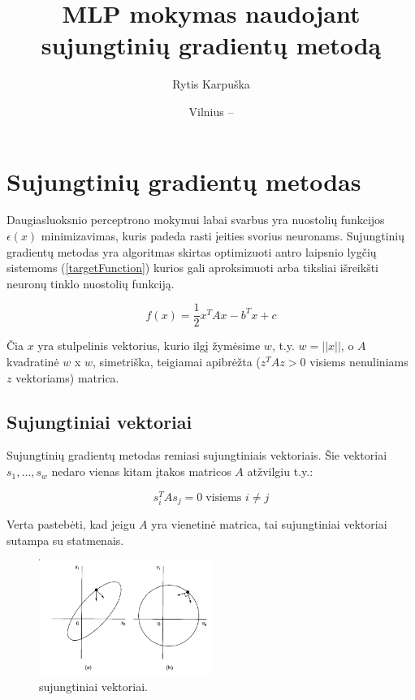 \documentclass{VUMIFPSmagistrinis}
\title{MLP mokymas naudojant sujungtinių gradientų metodą}
\author{Rytis Karpuška}
\date{Vilnius – \the\year}
\begin{document}
\maketitle

\tableofcontents

\section{Sujungtinių gradientų metodas}

Daugiasluoksnio perceptrono mokymui labai svarbus yra nuostolių funkcijos $\epsilon(x)$ minimizavimas, kuris padeda rasti įeities svorius neuronams.
Sujungtinių gradientų metodas yra algoritmas skirtas optimizuoti antro laipsnio lygčių sistemoms (\ref{targetFunction}) kurios gali aproksimuoti arba tiksliai išreikšti neuronų tinklo nuostolių funkciją.

\begin{equation}
	f(x) = \dfrac{1}{2} x^{T}Ax - b^{T}x + c
	\label{targetFunction}
\end{equation}

Čia $x$ yra stulpelinis vektorius, kurio ilgį žymėsime $w$, t.y. $w = ||x||$, o $A$ kvadratinė $w$ x $w$, simetriška, teigiamai apibrėžta ($z^{T}Az > 0$ visiems nenuliniams $z$ vektoriams)  matrica.



\subsection{Sujungtiniai vektoriai}

Sujungtinių gradientų metodas remiasi sujungtiniais vektoriais.
Šie vektoriai $s_{1}, ... ,s_{w}$  nedaro vienas kitam įtakos matricos $A$ atžvilgiu t.y.:

\begin{equation}
	s_{i}^{T} A s_{j} = 0 \; \text{visiems $i \neq j$}
\end{equation}

Verta pastebėti, kad jeigu $A$ yra vienetinė matrica, tai sujungtiniai vektoriai sutampa su statmenais.

\begin{figure}[H]
\begin{center}
\includegraphics[width=0.5\textwidth]{conjugateVectors.png}
\caption{sujungtiniai vektoriai.}
\label{conjugateVectors}
\end{center}
\end{figure}
\end{document}
